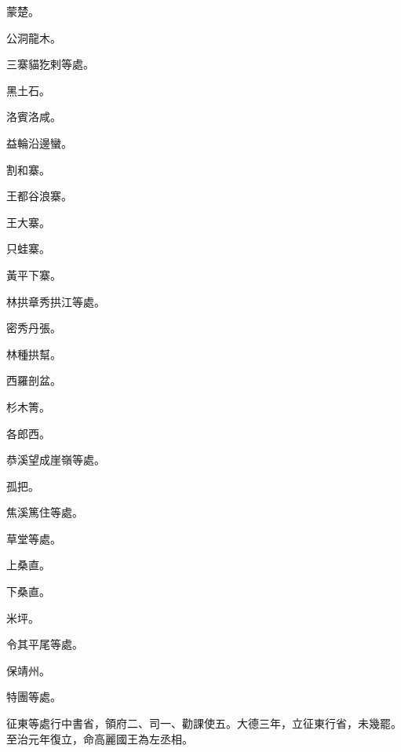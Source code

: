 \begin{pinyinscope}
 蒙楚。



 公洞龍木。



 三寨貓犵剌等處。



 黑土石。



 洛賓洛咸。



 益輪沿邊蠻。



 割和寨。



 王都谷浪寨。



 王大寨。



 只蛙寨。



 黃平下寨。



 林拱章秀拱江等處。



 密秀丹張。



 林種拱幫。



 西羅剖盆。



 杉木箐。



 各郎西。



 恭溪望成崖嶺等處。



 孤把。



 焦溪篤住等處。



 草堂等處。



 上桑直。



 下桑直。



 米坪。



 令其平尾等處。



 保靖州。



 特團等處。



 征東等處行中書省，領府二、司一、勸課使五。大德三年，立征東行省，未幾罷。至治元年復立，命高麗國王為左丞相。




\end{pinyinscope}
